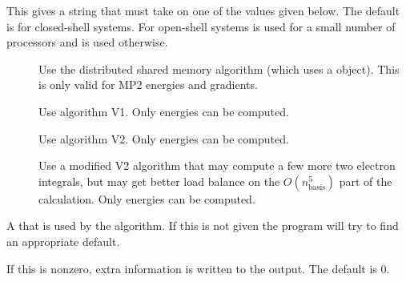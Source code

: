 \begin{description}
\begin{description}
     \end{description}

  \item[\keywd{algorithm}] This gives a string that must take on one of the
     values given below.  The default is  for closed-shell
     systems.  For open-shell systems  is used for a small number
     of processors and  is used otherwise.

     \begin{description}

        \item[] Use the distributed shared memory algorithm
          (which uses a  object).  This is only valid
          for MP2 energies and gradients.

        \item[] Use algorithm V1.  Only energies can be
          computed.

        \item[] Use algorithm V2.  Only energies can be
          computed.

        \item[] Use a modified V2 algorithm that may compute a
           few more two electron integrals, but may get better load balance
           on the $O(n_\mathrm{basis}^5)$ part of the calculation.  Only
           energies can be computed.

     \end{description}

  \item[\keywd{memorygrp}] A 
      that is used by the 
     algorithm.  If this is not given the program will try to find an
     appropriate default.

  \item[\keywd{debug}] If this is nonzero, extra information is written to
     the output.  The default is 0.

\end{description}


